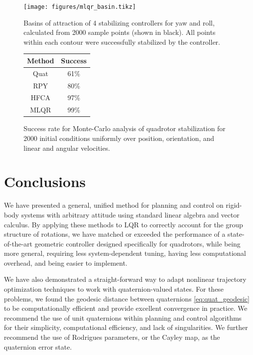 \documentclass[letterpaper, 10 pt, conference]{ieeeconf}  %
\begin{document}
	    \begin{figure}[ht]
	        \begin{minipage}{0.60\linewidth}
                \centering
                \texttt{[image: figures/mlqr\_basin.tikz]}
                \caption{Basins of attraction of 4 stabilizing controllers for yaw and roll, calculated from 2000 sample points (shown in black). All points within each contour were successfully stabilized by the controller.}
                \label{fig:mlqr_basin}
            \end{minipage}
	        \hspace{0.05\linewidth}
            \begin{minipage}{0.34\linewidth}
                \centering
                \begin{tabular}{cc}
                    \toprule
                    \textbf{Method} & \textbf{Success} \\
                    \midrule
                    Quat & 61\% \\
                    RPY  & 80\% \\
                    HFCA & 97\% \\
                    MLQR & 99\% \\
                    \bottomrule
                \end{tabular}
                \caption{Success rate for Monte-Carlo analysis of quadrotor stabilization for 2000 initial conditions uniformly over position, orientation, and linear and angular velocities.}
                \label{tab:mlqr_success}
            \end{minipage}
        \end{figure}

\section{Conclusions} \label{sec:conclusion}
    We have presented a general, unified method for planning and control on rigid-body
    systems with arbitrary attitude using standard linear algebra and vector calculus. By
    applying these methods to LQR to correctly account for the group structure of
    rotations, we have matched or exceeded the performance of a state-of-the-art
    geometric controller designed specifically for quadrotors, while being more general,
    requiring less system-dependent tuning, having less computational overhead, and being
    easier to implement.
    
    We have also demonstrated a straight-forward way to adapt nonlinear trajectory
    optimization techniques to work with quaternion-valued states. For these problems, we
    found the geodesic distance between quaternions \eqref{eq:quat_geodesic} to be
    computationally efficient and provide excellent convergence in practice. We recommend
    the use of unit quaternions within planning and control algorithms for their
    simplicity, computational efficiency, and lack of singularities. We further recommend
    the use of Rodrigues parameters, or the Cayley map, as the quaternion error state.
    
\end{document}
